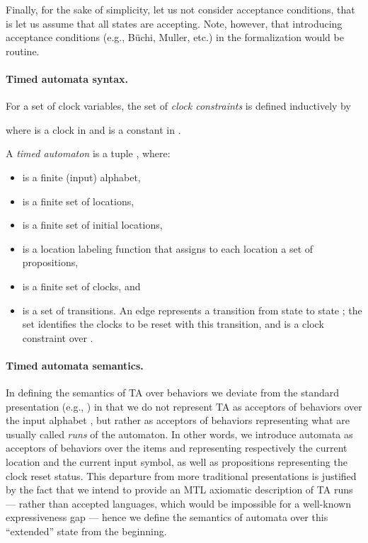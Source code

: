 \documentclass[a4paper]{article}
\theoremstyle{plain}
\theoremstyle{definition}
\begin{document}
Finally, for the sake of simplicity, let us not consider acceptance conditions, that is let us assume that all states are accepting.
Note, however, that introducing acceptance conditions (e.g., B\"uchi, Muller, etc.) in the formalization would be routine.


\paragraph{Timed automata syntax.}

For a set  of clock variables, the set  of \emph{clock constraints}  is defined inductively by

where  is a clock in  and  is a constant in .


A \emph{timed automaton}  is a tuple , where:
\begin{itemize}
\item  is a finite (input) alphabet,
\item  is a finite set of locations,
\item  is a finite set of initial locations,
\item  is a location labeling function that assigns to each location  a set  of propositions,
\item  is a finite set of clocks, and
\item  is a set of transitions.
  An edge  represents a transition from state  to state ; the set  identifies the clocks to be reset with this transition, and  is a clock constraint over .
\end{itemize}


\paragraph{Timed automata semantics.}
In defining the semantics of TA over behaviors we deviate from the standard presentation (e.g., \cite{AFH96,MNP06}) in that we do not represent TA as acceptors of behaviors over the input alphabet , but rather as acceptors of behaviors representing what are usually called \emph{runs} of the automaton.
In other words, we introduce automata as acceptors of behaviors over the items  and  representing respectively the current location and the current input symbol, as well as propositions  representing the clock reset status.
This departure from more traditional presentations is justified by the fact that we intend to provide an MTL axiomatic description of TA runs --- rather than accepted languages, which would be impossible for a well-known expressiveness gap \cite{HRS98} --- hence we define the semantics of automata over this ``extended'' state from the beginning.
\end{document}
